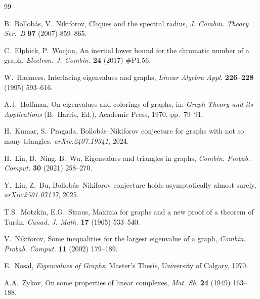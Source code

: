 \documentclass[preprint,12pt]{elsarticle}
\theoremstyle{plain}
\theoremstyle{definition}
\begin{document}

\begin{thebibliography}{99}

B.~Bollob\'as, V.~Nikiforov,
Cliques and the spectral radius,
\textit{J. Combin. Theory Ser.~B} \textbf{97} (2007) 859--865.

C.~Elphick, P.~Wocjan,
An inertial lower bound for the chromatic number of a graph,
\textit{Electron. J. Combin.} \textbf{24} (2017) \#P1.56.

W.~Haemers,
Interlacing eigenvalues and graphs,
\textit{Linear Algebra Appl.} \textbf{226--228} (1995) 593--616.

A.J.~Hoffman,
On eigenvalues and colorings of graphs,
in: \textit{Graph Theory and its Applications} (B.~Harris, Ed.),
Academic Press, 1970, pp.~79--91.

H.~Kumar, S.~Pragada,
Bollob\'as--Nikiforov conjecture for graphs with not so many triangles,
\textit{arXiv:2407.19341}, 2024.

H.~Lin, B.~Ning, B.~Wu,
Eigenvalues and triangles in graphs,
\textit{Combin. Probab. Comput.} \textbf{30} (2021) 258--270.

Y.~Liu, Z.~Bu,
Bollob\'as--Nikiforov conjecture holds asymptotically almost surely,
\textit{arXiv:2501.07137}, 2025.

T.S.~Motzkin, E.G.~Straus,
Maxima for graphs and a new proof of a theorem of Tur\'an,
\textit{Canad. J. Math.} \textbf{17} (1965) 533--540.

V.~Nikiforov,
Some inequalities for the largest eigenvalue of a graph,
\textit{Combin. Probab. Comput.} \textbf{11} (2002) 179--189.

E.~Nosal,
\textit{Eigenvalues of Graphs},
Master's Thesis, University of Calgary, 1970.

A.A.~Zykov,
On some properties of linear complexes,
\textit{Mat. Sb.} \textbf{24} (1949) 163--188.

\end{thebibliography}
\end{document}
